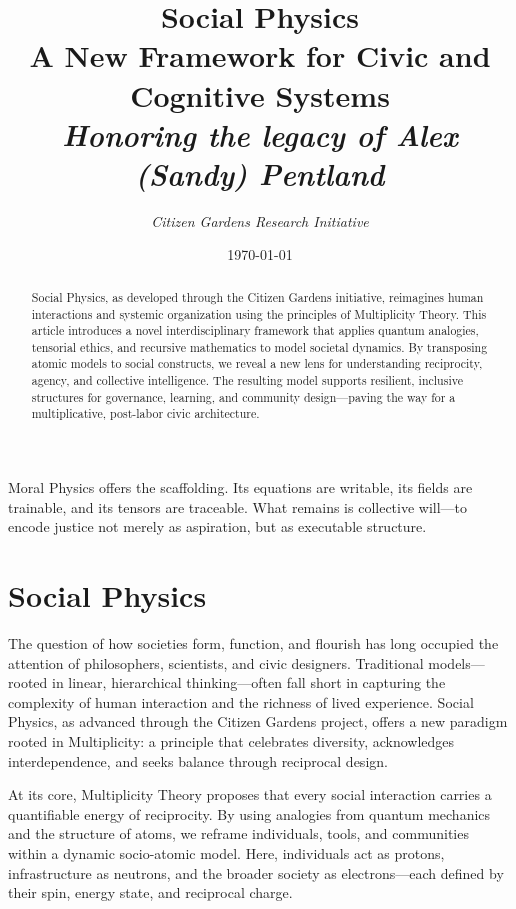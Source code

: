 \documentclass{article}
\theoremstyle{plain}
\theoremstyle{claimstyle}
\begin{document}
Moral Physics offers the scaffolding. Its equations are writable, its fields are trainable, and its tensors are traceable. What remains is collective will—to encode justice not merely as aspiration, but as executable structure.

\newpage
\title{Social Physics\\ \large A New Framework for Civic and Cognitive Systems\\ \large \textit{Honoring the legacy of Alex (Sandy) Pentland}}
\author{\textit {Citizen Gardens Research Initiative}}
\date{\today}

\maketitle

\begin{abstract}
Social Physics, as developed through the Citizen Gardens initiative, reimagines human interactions and systemic organization using the principles of Multiplicity Theory. This article introduces a novel interdisciplinary framework that applies quantum analogies, tensorial ethics, and recursive mathematics to model societal dynamics. By transposing atomic models to social constructs, we reveal a new lens for understanding reciprocity, agency, and collective intelligence. The resulting model supports resilient, inclusive structures for governance, learning, and community design—paving the way for a multiplicative, post-labor civic architecture.
\end{abstract}

\section{Social Physics}

The question of how societies form, function, and flourish has long occupied the attention of philosophers, scientists, and civic designers. Traditional models—rooted in linear, hierarchical thinking—often fall short in capturing the complexity of human interaction and the richness of lived experience. Social Physics, as advanced through the Citizen Gardens project, offers a new paradigm rooted in Multiplicity: a principle that celebrates diversity, acknowledges interdependence, and seeks balance through reciprocal design.

At its core, Multiplicity Theory proposes that every social interaction carries a quantifiable energy of reciprocity. By using analogies from quantum mechanics and the structure of atoms, we reframe individuals, tools, and communities within a dynamic socio-atomic model. Here, individuals act as protons, infrastructure as neutrons, and the broader society as electrons—each defined by their spin, energy state, and reciprocal charge.
\end{document}
